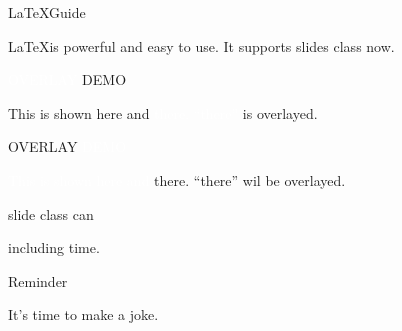 \documentclass[11pt]{slides}
\begin{document}
\begin{slide}
\begin{center}
\LaTeX Guide
\end{center}
\LaTeX is powerful and easy to use. It supports slides class now.
\end{slide}

\begin{slide}
\begin{center}
\textcolor{white}{OVERLAY} DEMO
\end{center}
This is shown here and \textcolor{white}{there.} \textcolor{white}{``there''} is overlayed.

\begin{overlay}
\begin{center}
OVERLAY \textcolor{white}{DEMO}
\end{center}
\textcolor{white}{This is shown here and }there. ``there'' wil be overlayed.
\end{overlay}
\end{slide}

\begin{slide}
slide class can

including time.
\end{slide}
\begin{note}
\begin{center}
Reminder
\end{center}
It's time to make a joke.
\end{note}
\end{document}
